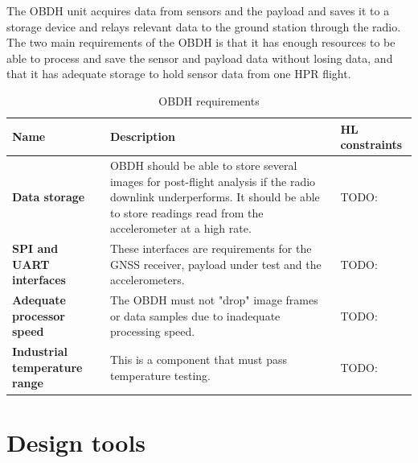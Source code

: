 \documentclass[]{report}
\begin{document}
The OBDH unit acquires data from sensors and the payload and saves it to a storage device and relays relevant data to the ground station through the radio. The two main requirements of the OBDH is that it has enough resources to be able to process and save the sensor and payload data without losing data, and that it has adequate storage to hold sensor data from one HPR flight.

\begin{table}[H]
  \centering
  \begin{tabular}{|L{0.2\textwidth}|L{0.495\textwidth}|L{0.2\textwidth}|}
    \hline
    \textbf{Name}                         & \textbf{Description}                                                                                                                                                                      & \textbf{HL constraints} \\ \hline
    \textbf{Data storage}                 & OBDH should be able to store several images for post-flight analysis if the radio downlink underperforms. It should be able to store readings read from the accelerometer at a high rate. & TODO:                   \\\hline
    \textbf{SPI and UART interfaces}      & These interfaces are requirements for the GNSS receiver, payload under test and the accelerometers.                                                                                       & TODO:                   \\\hline
    \textbf{Adequate processor speed}     & The OBDH must not "drop" image frames or data samples due to inadequate processing speed.                                                                                                 & TODO:                   \\\hline
    \textbf{Industrial temperature range} & This is a component that must pass temperature testing.                                                                                                                                   & TODO:                   \\\hline
  \end{tabular}
  \caption{OBDH requirements}
  \label{tabl:obdh-requirements}
\end{table}


\section{Design tools}
\label{sec:design-tools}
\end{document}
